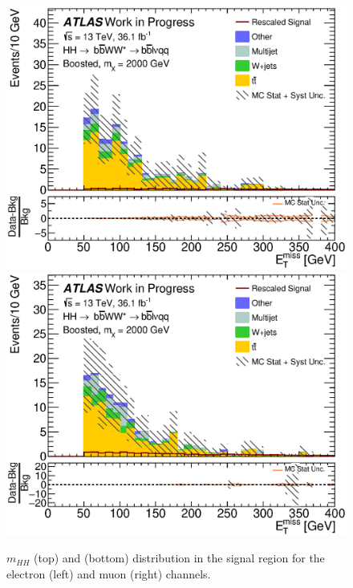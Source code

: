 \begin{figure}[h]
\begin{center}
\includegraphics[scale=0.33]{figures/kinplots/C_2tag_SR_elec_presel_met50_MET}
\includegraphics[scale=0.33]{figures/kinplots/C_2tag_SR_muon_presel_met50_MET}\\
\caption[Kinematic distributions in the signal region for the electron and muon channels]{$m_{HH}$ (top) and \met (bottom) distribution in the signal region for the electron (left) and muon (right) channels.}
\end{center}
\end{figure}